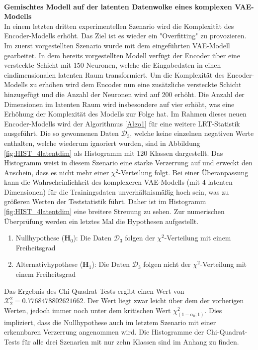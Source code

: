 \documentclass[%
thesis=student,%
coverpage=false,%
titlepage=false,%
headmarks=true, %
german,%
font=libertine, %
math=newpxtx, %
BCOR=5mm,%
coverBCOR=11mm%
]{tumbook}
\theoremstyle{break}
\begin{document}
\\
\textbf{Gemischtes Modell auf der latenten Datenwolke eines komplexen VAE-Modells}\\
In einem letzten dritten experimentellen Szenario wird die Komplexität des Encoder-Modells erhöht. Das Ziel ist es wieder ein "Overfitting" zu provozieren. Im zuerst vorgestellten Szenario wurde mit dem eingeführten VAE-Modell gearbeitet. In dem bereits vorgestellten Modell verfügt der Encoder über eine versteckte Schicht mit 150 Neuronen, welche die Eingabedaten in einen eindimensionalen latenten Raum transformiert. Um die Komplexität des Encoder-Modells zu erhöhen wird dem Encoder nun eine zusätzliche versteckte Schicht hinzugefügt und die Anzahl der Neuronen wird auf 200 erhöht. Die Anzahl der Dimensionen im latenten Raum wird insbesondere auf vier erhöht, was eine Erhöhung der Komplexität des Modells zur Folge hat. Im Rahmen dieses neuen Encoder-Modells wird der Algorithmus \ref{Algo1} für eine weitere LRT-Statistik ausgeführt. Die so gewonnenen Daten $\mathcal{D}_3$, welche keine einzelnen negativen Werte enthalten, welche wiederum ignoriert wurden, sind in Abbildung \ref{fig:HIST_4latentdim} als Histogramm mit 120 Klassen dargestellt. Das Histogramm weist in diesem Szenario eine starke Verzerrung auf und erweckt den Anschein, dass es nicht mehr einer $\chi^2$-Verteilung folgt. Bei einer  Überanpassung kann die Wahrscheinlichkeit des komplexeren VAE-Modells (mit 4 latenten Dimensionen) für die Trainingsdaten unverhältnismäßig hoch sein, was zu größeren Werten der Teststatistik führt. Daher ist im Histogramm \ref{fig:HIST_4latentdim} eine breitere Streuung zu sehen. Zur numerischen Überprüfung werden ein letztes Mal die Hypothesen aufgestellt. \\
\begin{enumerate}
	\item Nullhypothese ($\mathbf{H}_0$): Die Daten $\mathcal{D}_3$ folgen der $\chi^2$-Verteilung mit einem Freiheitsgrad\\
	\item Alternativhypothese ($\mathbf{H}_1$): Die Daten $\mathcal{D}_3$ folgen nicht der $\chi^2$-Verteilung mit einem Freiheitsgrad \\
\end{enumerate} 
Das Ergebnis des Chi-Quadrat-Tests ergibt einen Wert von
$\mathcal{X}^2_2 = 0.7768478802621662$. Der Wert liegt zwar leicht über dem der vorherigen Werten, jedoch immer noch unter dem kritischen Wert $\chi^2_{(1-\alpha_0; 1)}$. Dies impliziert, dass die Nullhypothese auch im letztem Szenario mit einer erkennbaren Verzerrung angenommen wird. Die Histogramme der Chi-Quadrat-Tests für alle drei Szenarien mit nur zehn Klassen sind im Anhang zu finden. \\
\end{document}
